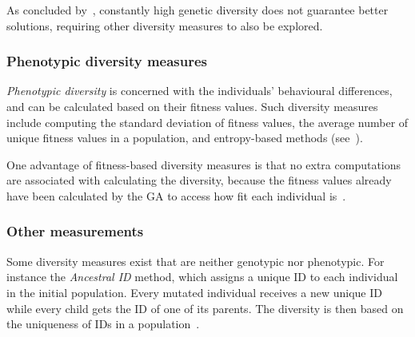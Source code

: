 As concluded by~\cite{Darwen00doesextra}, constantly high genetic diversity does not guarantee better solutions, requiring other diversity measures to also be explored.

\subsubsection{Phenotypic diversity measures}
\emph{Phenotypic diversity} is concerned with the individuals' behavioural differences, and can be calculated based on their fitness values. Such diversity measures include computing the standard deviation of fitness values, the average number of unique fitness values in a population, and entropy-based methods (see~\cite{1250187, 1266373}).

One advantage of fitness-based diversity measures is that no extra computations are associated with calculating the diversity, because the fitness values already have been calculated by the GA to access how fit each individual is~\cite{Nguyen:2006:ASPGP}.

\subsubsection{Other measurements}
Some diversity measures exist that are neither genotypic nor phenotypic. For instance the \emph{Ancestral ID} method, which assigns a unique ID to each individual in the initial population. Every mutated individual receives a new unique ID while every child gets the ID of one of its parents. The diversity is then based on the uniqueness of IDs in a population~\cite{1250187}.


